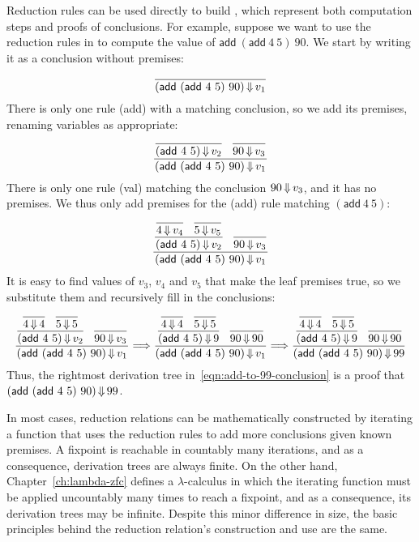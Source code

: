 Reduction rules can be used directly to build , which represent both computation steps and proofs of conclusions.
For example, suppose we want to use the reduction rules in  to compute the value of $\mathsf{add}~(\mathsf{add}~4~5)~90$.
We start by writing it as a conclusion without premises:
\begin{equation}
	\dfrac{}{(\mathsf{add}~(\mathsf{add}~4~5)~90) \operatorname{\Downarrow} v_1}
\label{eqn:add-to-99-start}
\end{equation}
There is only one rule (add) with a matching conclusion, so we add its premises, renaming variables as appropriate:
\begin{equation}
	\dfrac{\dfrac{}{(\mathsf{add}~4~5) \operatorname{\Downarrow} v_2} \;\;\, \dfrac{}{90 \operatorname{\Downarrow} v_3}}{(\mathsf{add}~(\mathsf{add}~4~5)~90) \operatorname{\Downarrow} v_1}
\end{equation}
There is only one rule (val) matching the conclusion $90 \operatorname{\Downarrow} v_3$, and it has no premises.
We thus only add premises for the (add) rule matching $(\mathsf{add}~4~5)$:
\begin{equation}
	\dfrac{\dfrac{\dfrac{}{4 \operatorname{\Downarrow} v_4} \;\;\, \dfrac{}{5 \operatorname{\Downarrow} v_5}}{(\mathsf{add}~4~5) \operatorname{\Downarrow} v_2} \;\;\, \dfrac{}{90 \operatorname{\Downarrow} v_3}}{(\mathsf{add}~(\mathsf{add}~4~5)~90) \operatorname{\Downarrow} v_1}
\end{equation}
It is easy to find values of $v_3$, $v_4$ and $v_5$ that make the leaf premises true, so we substitute them and recursively fill in the conclusions:
\begin{equation}
	\dfrac{\dfrac{\dfrac{}{4 \operatorname{\Downarrow} 4} \;\;\, \dfrac{}{5 \operatorname{\Downarrow} 5}}{(\mathsf{add}~4~5) \operatorname{\Downarrow} v_2} \;\;\, \dfrac{}{90 \operatorname{\Downarrow} v_3}}{(\mathsf{add}~(\mathsf{add}~4~5)~90) \operatorname{\Downarrow} v_1}
	\Longrightarrow
	\dfrac{\dfrac{\dfrac{}{4 \operatorname{\Downarrow} 4} \;\;\, \dfrac{}{5 \operatorname{\Downarrow} 5}}{(\mathsf{add}~4~5) \operatorname{\Downarrow} 9} \;\;\, \dfrac{}{90 \operatorname{\Downarrow} 90}}{(\mathsf{add}~(\mathsf{add}~4~5)~90) \operatorname{\Downarrow} v_1}
	\Longrightarrow
	\dfrac{\dfrac{\dfrac{}{4 \operatorname{\Downarrow} 4} \;\;\, \dfrac{}{5 \operatorname{\Downarrow} 5}}{(\mathsf{add}~4~5) \operatorname{\Downarrow} 9} \;\;\, \dfrac{}{90 \operatorname{\Downarrow} 90}}{(\mathsf{add}~(\mathsf{add}~4~5)~90) \operatorname{\Downarrow} 99}
\label{eqn:add-to-99-conclusion}
\end{equation}
Thus, the rightmost derivation tree in~\eqref{eqn:add-to-99-conclusion} is a proof that $(\mathsf{add}~(\mathsf{add}~4~5)~90) \operatorname{\Downarrow} 99$.

In most cases, reduction relations can be mathematically constructed by iterating a function that uses the reduction rules to add more conclusions given known premises.
A fixpoint is reachable in countably many iterations, and as a consequence, derivation trees are always finite.
On the other hand, Chapter~\ref{ch:lambda-zfc} defines a $\lambda$-calculus in which the iterating function must be applied uncountably many times to reach a fixpoint, and as a consequence, its derivation trees may be infinite.
Despite this minor difference in size, the basic principles behind the reduction relation's construction and use are the same.

